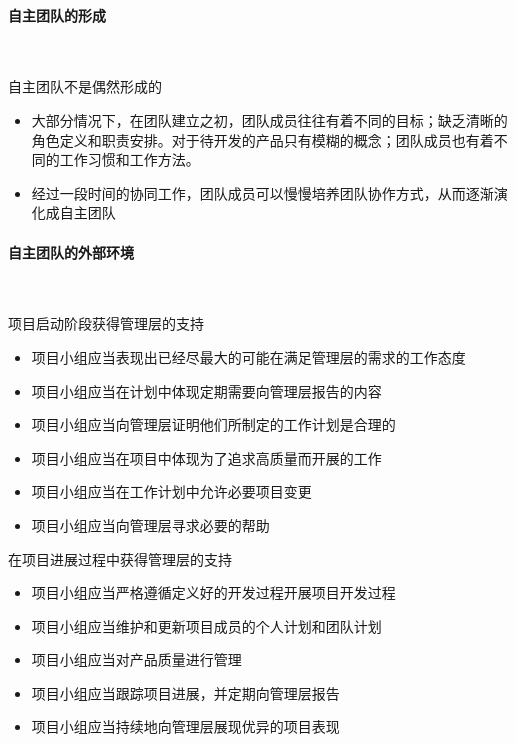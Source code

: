 \paragraph{自主团队的形成}~{} \par
自主团队不是偶然形成的
\begin{itemize}
    \item 大部分情况下，在团队建立之初，团队成员往往有着不同的目标；缺乏清晰的角色定义和职责安排。对于待开发的产品只有模糊的概念；团队成员也有着不同的工作习惯和工作方法。
    \item 经过一段时间的协同工作，团队成员可以慢慢培养团队协作方式，从而逐渐演化成自主团队
\end{itemize}

\paragraph{自主团队的外部环境}~{} \par
\vspace{-0.8em}
\begin{multicols}{2}
    项目启动阶段获得管理层的支持
    \begin{itemize}
        \item 项目小组应当表现出已经尽最大的可能在满足管理层的需求的工作态度
        \item 项目小组应当在计划中体现定期需要向管理层报告的内容
        \item 项目小组应当向管理层证明他们所制定的工作计划是合理的
        \item 项目小组应当在项目中体现为了追求高质量而开展的工作
        \item 项目小组应当在工作计划中允许必要项目变更
        \item 项目小组应当向管理层寻求必要的帮助
    \end{itemize}
    
    在项目进展过程中获得管理层的支持
    \begin{itemize}
        \item 项目小组应当严格遵循定义好的开发过程开展项目开发过程
        \item 项目小组应当维护和更新项目成员的个人计划和团队计划
        \item 项目小组应当对产品质量进行管理
        \item 项目小组应当跟踪项目进展，并定期向管理层报告
        \item 项目小组应当持续地向管理层展现优异的项目表现
    \end{itemize}
    
\end{multicols}
\vspace{-1em}


